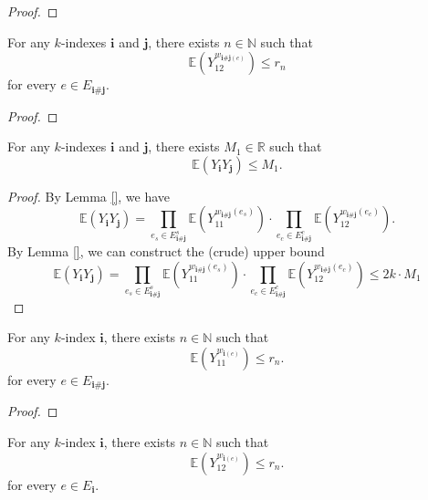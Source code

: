 \begin{proof}
\end{proof}
\begin{lemma}[R-2-12]
  \label{} %
  \uses{} %
  For any $k$-indexes $\mathbf{i}$ and $\mathbf{j}$, there exists $n \in \mathbb{N}$ such that
  \[
  \mathbb{E} (Y_{12}^{w_{\mathbf{i} \# \mathbf{j} (e)}}) \leq r_n
  \]
  for every $e \in E_{\mathbf{i} \# \mathbf{j}}$.
\end{lemma}
\begin{proof}
\end{proof}
\begin{lemma}[R-2-13]
  \label{} %
  \uses{} %
  For any $k$-indexes $\mathbf{i}$ and $\mathbf{j}$, there exists $M_1 \in \mathbb{R}$ such that
  \[
  \mathbb{E} (Y_\mathbf{i}Y_\mathbf{j}) \leq M_1.
  \]
\end{lemma}
\begin{proof}
  By Lemma \ref{}, we have
  \[
  \mathbb{E} (Y_\mathbf{i}Y_\mathbf{j}) 
  = \prod_{e_s \in E^s_{\mathbf{i} \# \mathbf{j}}} \mathbb{E} (Y_{11}^{w_{\mathbf{i} \# \mathbf{j}}(e_s)}) \cdot \prod_{e_c \in E^c_{\mathbf{i} \# \mathbf{j}}} \mathbb{E} (Y_{12}^{w_{\mathbf{i} \# \mathbf{j}}(e_c)}).
  \]
  By Lemma \ref{}, we can construct the (crude) upper bound
  \[
  \mathbb{E} (Y_\mathbf{i}Y_\mathbf{j}) 
  = \prod_{e_s \in E^s_{\mathbf{i} \# \mathbf{j}}} \mathbb{E} (Y_{11}^{w_{\mathbf{i} \# \mathbf{j}}(e_s)}) \cdot \prod_{e_c \in E^c_{\mathbf{i} \# \mathbf{j}}} \mathbb{E} (Y_{12}^{w_{\mathbf{i} \# \mathbf{j}}(e_c)})
  \leq 2k \cdot M_1
  \]
\end{proof}
\begin{lemma}[R-2-14]
  \label{} %
  \uses{} %
  For any $k$-index $\mathbf{i}$, there exists $n \in \mathbb{N}$ such that
  \[
  \mathbb{E} (Y_{11}^{w_{\mathbf{i} (e)}}) \leq r_n.
  \]
  for every $e \in E_{\mathbf{i} \# \mathbf{j}}$.
\end{lemma}
\begin{proof}
\end{proof}
\begin{lemma}[R-2-15]
  \label{} %
  \uses{} %
  For any $k$-index $\mathbf{i}$, there exists $n \in \mathbb{N}$ such that
  \[
  \mathbb{E} (Y_{12}^{w_{\mathbf{i} (e)}}) \leq r_n.
  \]
  for every $e \in E_\mathbf{i}$.
\end{lemma}
